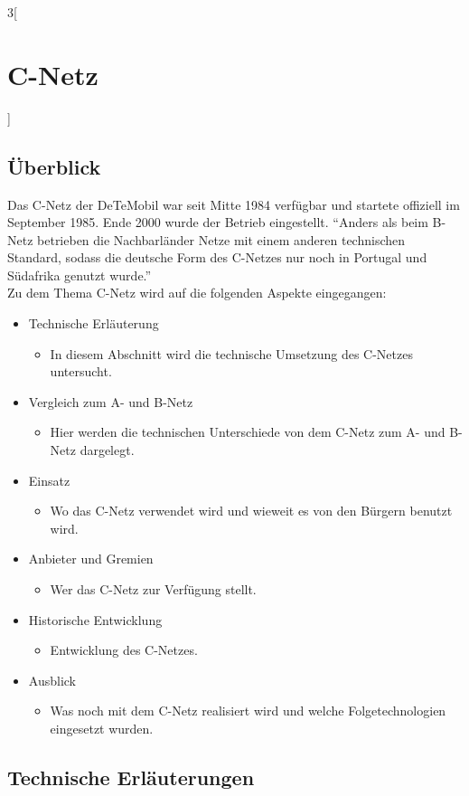 \begin{multicols}{3}[\section{C-Netz}]
\subsection*{Überblick}
Das C-Netz der DeTeMobil war seit Mitte 1984 verfügbar und startete offiziell im September 1985. Ende 2000 wurde der Betrieb eingestellt. \enquote{Anders als beim B-Netz betrieben die Nachbarländer Netze mit einem anderen technischen Standard, sodass die deutsche Form des C-Netzes nur noch in Portugal und Südafrika genutzt wurde.}~\cite{c-netz.1}\\
Zu dem Thema C-Netz wird auf die folgenden Aspekte eingegangen:
\begin{itemize}
	\item Technische Erläuterung
	\begin{itemize}[label={}]
		\item In diesem Abschnitt wird die technische Umsetzung des C-Netzes untersucht.
	\end{itemize}	
	\item Vergleich zum A- und B-Netz 
	\begin{itemize}[label={}]
		\item Hier werden die technischen Unterschiede von dem C-Netz zum A- und B-Netz dargelegt.
	\end{itemize}
	\item Einsatz		
	\begin{itemize}[label={}]
		\item Wo das C-Netz verwendet wird und wieweit es von den Bürgern benutzt wird.
	\end{itemize}
	\item Anbieter und Gremien
	\begin{itemize}[label={}]
		\item Wer das C-Netz zur Verfügung stellt.
	\end{itemize}
	\item Historische Entwicklung
	\begin{itemize}[label={}]
		\item Entwicklung des C-Netzes.
	\end{itemize}
	\item Ausblick
	\begin{itemize}[label={}]
		\item Was noch mit dem C-Netz realisiert wird und welche Folgetechnologien eingesetzt wurden.
	\end{itemize}
\end{itemize}
\subsection*{Technische Erläuterungen}


\end{multicols}
